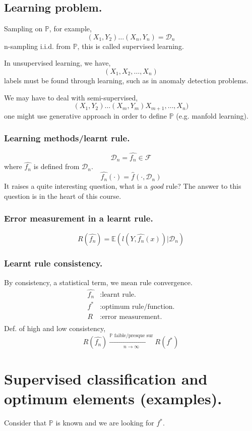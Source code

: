 		\subsection{Learning problem.}
			Sampling on $\mathbb{P}$, for example,
		  \[
				(X_1,Y_2)\ldots(X_n,Y_n)=\mathcal{D}_n
		  \]
		  n-sampling i.i.d. from $\mathbb{P}$, this is called supervised learning.

			In unsupervised learning, we have,
		  \[
				(X_1,X_2,\ldots,X_n)
		  \]
		  labels must be found through learning, such as in anomaly detection problems.

			We may have to deal with semi-supervised,
		  \[
								(X_1,Y_2)\ldots(X_m,Y_m) X_{m+1},\ldots,X_n)
		  \]
		  one might use generative approach in order to define $\mathbb{P}$ (e.g. manfold learning). 

		\subsubsection{Learning methods/learnt rule.}
		  \[
				\mathcal{D}_n = \hat{f_n} \in \mathcal{F}
		  \]
		  where $\hat{f_n}$ is defined from $\mathcal{D}_n$.
		  \[
				\hat{f_n}(\cdot)= \hat{f}(\cdot,\mathcal{D}_n)
		  \]
		  It raises a quite interesting question, what is a \emph{good} rule? The answer to this question is in the heart of this course.

		\subsubsection{Error measurement in a learnt rule.}
		  \[
				R(\hat{f_n}) = \mathbb{E}(l(Y,\hat{f_n}(x))|\mathcal{D}_n) 
		  \]

		\subsubsection{Learnt rule consistency.}
		  By consistency, a statistical term, we mean rule convergence.
		  \begin{align*}
            \hat{f_n} &: \mbox{learnt rule.}\\
            f^* &: \mbox{optimum rule/function.}\\
            R&: \mbox{error measurement.}\\
		  \end{align*}
		  Def. of high and low consistency,
		  \[
				R(\hat{f_n}) \xrightarrow[n\to \infty]{\mathbb{P}\text{ faible/presque sur}} R(f^*) 
		  \]

	\section{Supervised classification and optimum elements (examples).}
		  Consider that $\mathbb{P}$ is known and we are looking for $f^*$.


